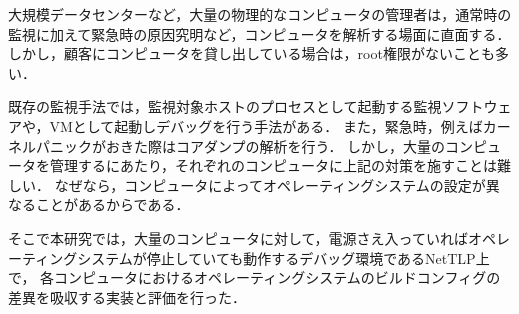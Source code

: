 \begin{jabstract}

大規模データセンターなど，大量の物理的なコンピュータの管理者は，通常時の監視に加えて緊急時の原因究明など，コンピュータを解析する場面に直面する．
しかし，顧客にコンピュータを貸し出している場合は，root権限がないことも多い．

既存の監視手法では，監視対象ホストのプロセスとして起動する監視ソフトウェアや，VMとして起動しデバッグを行う手法がある．
また，緊急時，例えばカーネルパニックがおきた際はコアダンプの解析を行う．
しかし，大量のコンピュータを管理するにあたり，それぞれのコンピュータに上記の対策を施すことは難しい．
なぜなら，コンピュータによってオペレーティングシステムの設定が異なることがあるからである．

そこで本研究では，大量のコンピュータに対して，電源さえ入っていればオペレーティングシステムが停止していても動作するデバッグ環境であるNetTLP\cite{246316}上で，
各コンピュータにおけるオペレーティングシステムのビルドコンフィグの差異を吸収する実装と評価を行った．

\end{jabstract}
